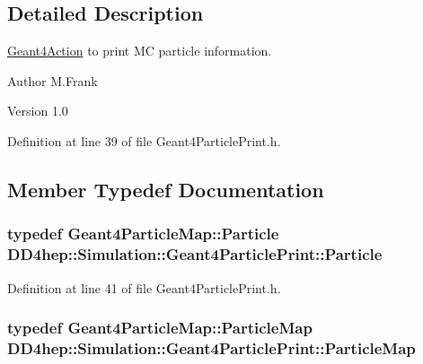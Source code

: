 \subsection{Detailed Description}
\hyperlink{class_d_d4hep_1_1_simulation_1_1_geant4_action}{Geant4Action} to print MC particle information. \begin{DoxyAuthor}{Author}
M.Frank 
\end{DoxyAuthor}
\begin{DoxyVersion}{Version}
1.0 
\end{DoxyVersion}


Definition at line 39 of file Geant4ParticlePrint.h.

\subsection{Member Typedef Documentation}
\hypertarget{class_d_d4hep_1_1_simulation_1_1_geant4_particle_print_a0d1712b05821d64c3f75e6226f553aa2}{
\subsubsection[{Particle}]{\setlength{\rightskip}{0pt plus 5cm}typedef {\bf Geant4ParticleMap::Particle} {\bf DD4hep::Simulation::Geant4ParticlePrint::Particle}}}
\label{class_d_d4hep_1_1_simulation_1_1_geant4_particle_print_a0d1712b05821d64c3f75e6226f553aa2}


Definition at line 41 of file Geant4ParticlePrint.h.\hypertarget{class_d_d4hep_1_1_simulation_1_1_geant4_particle_print_a1c6a9ccb9393484ee16c7cd344e20f4a}{
\subsubsection[{ParticleMap}]{\setlength{\rightskip}{0pt plus 5cm}typedef {\bf Geant4ParticleMap::ParticleMap} {\bf DD4hep::Simulation::Geant4ParticlePrint::ParticleMap}}}
\label{class_d_d4hep_1_1_simulation_1_1_geant4_particle_print_a1c6a9ccb9393484ee16c7cd344e20f4a}



